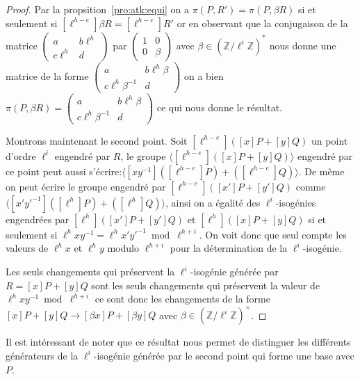 \documentclass[10pt,a4paper]{book}
\theoremstyle{plain}
\theoremstyle{definition}
\theoremstyle{definition}
\theoremstyle{definition}
\theoremstyle{definition}
\theoremstyle{remark}
\theoremstyle{remark}
\theoremstyle{definition}
\begin{document}
\begin{proof}
Par la propsition~\ref{pro:atk:equi} on a $\pi(P,R')=\pi(P,
\beta R)$ si et seulement si $[\ell^{h-e}]\beta R=[\ell^{h-e}]R'$ or en 
observant que la conjugaison de la matrice $\left( \begin{smallmatrix}a & b 
\ell^h \\c  \ell^{h} & d \end{smallmatrix} \right)$ par $\left( 
\begin{smallmatrix}1 & 0 \\0 & \beta \end{smallmatrix} \right)$ avec $\beta \in
\left( \mathbb{Z}/\ell^{i} \mathbb{Z}\right)^*$ nous donne une matrice de la 
forme $\left( \begin{smallmatrix}a & b \ell^h \beta \\c \ell^{h} \beta^{-1} &
 d \end{smallmatrix} \right)$ on a bien $\pi(P,\beta R)=\left( 
\begin{smallmatrix}a & b \ell^h \beta \\c \ell^{h} \beta^{-1} & d 
\end{smallmatrix} \right)$ ce qui nous donne le résultat.

Montrons maintenant le second point. Soit $[\ell^{h-e}]([x]P+[y]Q)$ un point 
d'ordre $\ell^i$ engendré par $R$, 
le groupe $\langle [\ell^{h-e}]([x]P+[y]Q) \rangle$ engendré par ce point peut 
aussi s'écrire:$\langle [xy^{-1}]([\ell^{h-e}]P)+ ([\ell^{h-e}]Q) \rangle$. De 
même on peut écrire le groupe engendré par $[\ell^{h-e}]([x']P+[y']Q)$ comme 
$\langle [x'y'^{-1}]([\ell^{h}]P)+ ([\ell^{h}]Q) \rangle$, ainsi on a 
égalité des $\ell^i$-isogénies engendrées par $[\ell^{h}]([x']P+[y']Q)$ et 
$[\ell^{h}]([x]P+[y]Q)$ si et seulement si $\ell^{h}xy^{-1}=\ell^{h}
x'y'^{-1}\bmod \ell^{h+i}$. On voit donc que seul compte les valeurs de 
$\ell^{h}x$ et $\ell^{h}y$ modulo $\ell^{h+i}$ pour la détermination de la 
$\ell^i$-isogénie.

Les seuls changements qui préservent la $\ell^i$-isogénie générée par 
$R=[x]P+[y]Q$ sont les seuls changements qui préservent la valeur de 
$\ell^{h}xy^{-1} \bmod \ell^{h+i}$ ce sont donc les changements de la forme 
$[x]P+[y]Q \rightarrow [\beta x]P+[\beta y]Q$ avec $\beta \in \left( \mathbb{Z}
/\ell^i\mathbb{Z} \right)^{\times}$. 
\end{proof}

Il est intéressant de noter que ce résultat nous permet de distinguer les 
différents générateurs de la $\ell^i$-isogénie générée par le second point qui
forme une base avec $P$. 
\end{document}
